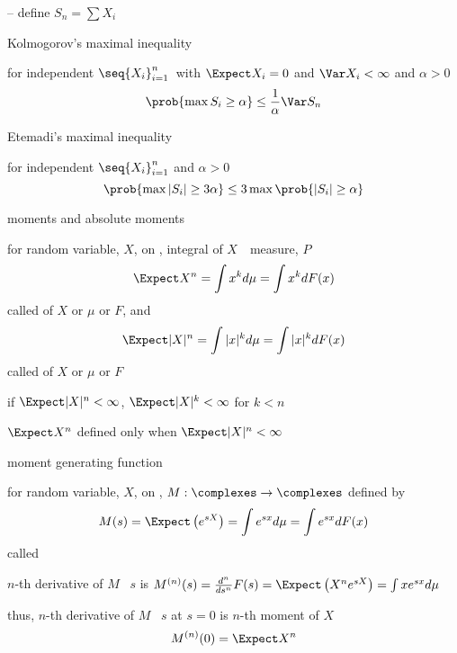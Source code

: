 \documentclass[17pt,landscape]{foils}
\newcommand{\algF}{\algk{F}}
\begin{document}
{-- define $S_n = \sum X_i$

\begin{myinequality}{Kolmogorov's maximal inequality}%

	for independent $\seq{X_i}_{i=1}^n$\ with $\Expect X_i =0$ and $\Var X_i<\infty$
	and $\alpha>0$
	$$
		\prob{\max S_i \geq \alpha} \leq \frac{1}{\alpha}\Var S_n
	$$

\end{myinequality}

\begin{myinequality}{Etemadi's maximal inequality}%

	for independent $\seq{X_i}_{i=1}^n$
	and $\alpha>0$
	$$
		\prob{\max |S_i| \geq 3\alpha} \leq 3 \max \prob{|S_i|\geq\alpha}
	$$

\end{myinequality}



\begin{mydefinition}{moments and absolute moments}%

	for random variable, $X$, on \meas{\Omega}{\algF}{P},
	integral of $X$\ \wrt\ measure, $P$
	$$
		\Expect X^n
			=
		\int x^k d\mu
			=
		\int x^k dF(x)
	$$
	called  of $X$ or $\mu$ or $F$,
	and
	$$
		\Expect |X|^n
			=
		\int |x|^k d\mu
			=
		\int |x|^k dF(x)
	$$
	called  of $X$ or $\mu$ or $F$
\end{mydefinition}

\bit
\vitem
	if $\Expect |X|^n<\infty$, $\Expect |X|^k<\infty$ for $k<n$

\vitem
	$\Expect X^n$ defined only when $\Expect|X|^n<\infty$
\eit
\vfill



\begin{mydefinition}{moment generating function}%

	for random variable, $X$, on \meas{\Omega}{\algF}{P},
	$M:\complexes \to \complexes$ defined by
	$$
		M(s)
			=
		\Expect \left( e^{sX} \right)
			=
		\int e^{sx} d\mu
			=
		\int e^{sx} dF(x)
	$$
	called 
\end{mydefinition}
\bit
	\item
		$n$-th derivative of $M$ \wrt\ $s$ is
		$
			M^{(n)}(s) = \frac{d^n}{ds^n} F(s) = \Expect \left(X^ne^{sX}\right) = \int xe^{sx} d\mu
		$
	\item
		thus,
		$n$-th derivative of $M$ \wrt\ $s$ at $s=0$ is $n$-th moment of $X$
		$$
			M^{(n)}(0) = \Expect X^n
		$$

}
\end{document}
